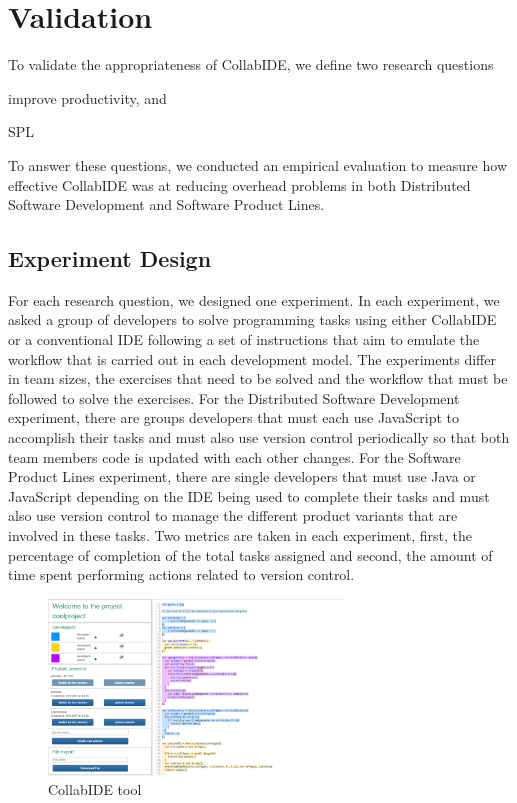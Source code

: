 

\section{Validation}
\label{sec:validation}

To validate the appropriateness of CollabIDE, we define two research questions
\begin{enumerate*}[label=(\arabic*)]
\item improve productivity, and
\item SPL
\end{enumerate*} 
To answer these questions, we conducted an empirical evaluation 
to measure how effective CollabIDE was at reducing overhead problems 
in both Distributed Software Development and Software Product Lines.

\subsection{Experiment Design}

For each research question, we designed one experiment. In each experiment, we asked 
a group of developers to solve programming tasks using either CollabIDE or a 
conventional IDE following a set of instructions that aim to emulate the workflow that is carried out in each development model. The experiments differ in team sizes, the exercises that need to be solved and the workflow that must be followed to solve the exercises. For the Distributed Software Development experiment, there are groups developers that must each use JavaScript to accomplish their tasks and must also use version control periodically so that both team members code is updated with each other changes. For the Software Product Lines experiment, there are single developers that must use Java or JavaScript depending on the IDE being used to complete their tasks and must also use version control to manage the different product variants that are involved in these tasks. Two metrics are taken in each experiment, first, the percentage of completion of the total tasks assigned and second, the amount of time spent performing actions related to version control.

\begin{figure}[htbp]
  \centering
  \includegraphics[width=0.7\textwidth]{img/fig1-collabIDEGeneral}
  \caption{CollabIDE tool}
  \label{fig:collabide}
\end{figure}

